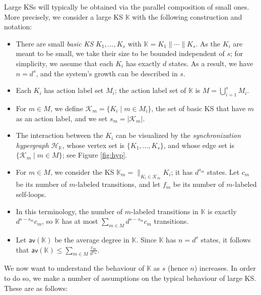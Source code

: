 \documentclass[runngingheads]{llncs}
\begin{document}
Large KSs will typically be obtained via the parallel composition of small ones. More precisely, we consider a large KS $\mathbb{K}$ with the following construction and notation:
\begin{itemize}
\item There are small \emph{basic KS} $K_1,\ldots,K_s$ with $\mathbb{K} = K_1 \mathbin{\parallel}\cdots \mathbin{\parallel}K_s$. As the $K_i$ are meant to be small, we take their size to be bounded independent of $s$; for simplicity, we assume that each $K_i$ has exactly $d$ states. As a result, we have $n = d^s$, and the system's growth can be described in $s$.
\item Each $K_i$ has action label set $M_i$; the action label set of $\mathbb{K}$ is $M = \bigcup_{i=1}^s M_i$.
\item For $m \in M$, we define $\mathcal{K}_m = \{K_i \mid m \in M_i\}$, the set of basic KS that have $m$ as an action label, and we set $s_m = |\mathcal{K}_m|$.
\item The interaction between the $K_i$ can be visualized by the \emph{synchronization hypergraph} $\mathcal{H}_{\mathbb{K}}$, whose vertex set is $\{K_1,\ldots,K_s\}$, and whose edge set is $\{\mathcal{K}_m \mid m \in M\}$; see Figure \ref{fig:hyp}.
\item For $m \in M$, we consider the KS $\mathbb{K}_m = \mathbin{\parallel}_{K_i \in \mathcal{K}_m} K_i$; it has $d^{s_m}$ states. Let $c_m$ be its number of $m$-labeled transitions, and let $f_m$ be its number of $m$-labeled self-loops.
\item In this terminology, the number of $m$-labeled transitions in $\mathbb{K}$ is exactly $d^{s-s_m}c_m$, so $\mathbb{K}$ has at most $\sum_{m \in M} d^{s-s_m}c_m$ transitions.
\item Let $\mathsf{av}(\mathbb{K})$ be the average degree in $\mathbb{K}$. Since $\mathbb{K}$ has $n = d^s$ states, it follows that $\mathsf{av}(\mathbb{K}) \leq \sum_{m \in M} \tfrac{c_m}{d^{s_m}}$.
\end{itemize}

We now want to understand the behaviour of $\mathbb{K}$ as $s$ (hence $n$) increases. In order to do so, we make a number of assumptions on the typical behaviour of large KS. These are as follows:
\end{document}

